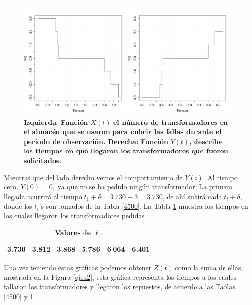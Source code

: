 \begin{figure}[h!]
\begin{center}
\includegraphics[scale=.35]{ejeu1.pdf}
\end{center}
\vspace{-1 cm} \caption {\bf Izquierda: Funci\'on $X(t)$ el n\'umero de transformadores en el almac\'en que se usaron para cubrir las fallas durante el periodo de observaci\'on. Derecha: Funci\'on $Y(t)$, describe los tiempos en que llegaron los transformadores que fueron solicitados.}\label{ejeu1}
\end{figure}

\noindent Mientras que del lado derecho vemos el comportamiento de $Y(t)$. Al tiempo cero, $Y(0)=0,$ ya que  no se ha pedido ning\'un transformador. La primera llegada ocurrir\'a al tiempo $t_1+\delta=0.730+3=3.730$, de ah\'i subir\'a cada $t_i+\delta$, donde los $t_i$'s son tomados de la Tabla \ref{4500}.  La  Tabla  \ref{23} muestra los tiempos en los cuales llegaron los transformadores pedidos.
\begin{table}[h!]\small
\centering
\caption{\bf Valores de $\underline{\ell.}$}\label{23}
\vspace{0.3cm }\begin{tabular}{cccccc}
\toprule[0.6mm]
3.730 & 3.812 & 3.868 &  5.786 &  6.064 &  6.401  \\
\toprule[0.6mm]
\end{tabular}

\end{table}



 \noindent Una vez teniendo estas gr\'aficas podemos obtener $Z(t)$ como la suma de ellas, mostrada en la Figura \ref{ejeu2}, esta gr\'afica representa los tiempos a los cuales fallaron los transformadores y llegaron los repuestos, de acuerdo a las Tablas \ref{4500} y \ref{23}. 

